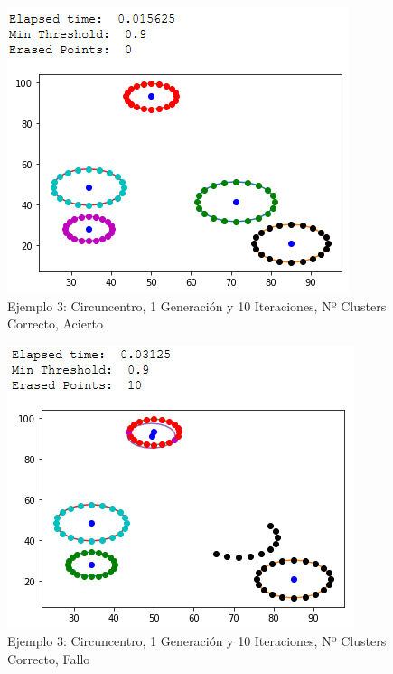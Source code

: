 \documentclass[conference,a4paper]{IEEEtran}
\begin{document}
\begin{figure}[H]
\centering
\includegraphics[scale=0.65]{Experimentacion/Ejemplo3/ej3_c_1_10_cc_correct}
\caption{Ejemplo 3: Circuncentro, 1 Generación y 10 Iteraciones,  Nº Clusters Correcto, Acierto\\}
\end{figure}

\begin{figure}[H]
\centering
\includegraphics[scale=0.65]{Experimentacion/Ejemplo3/ej3_c_1_10_cc_wrong}
\caption{Ejemplo 3: Circuncentro, 1 Generación y 10 Iteraciones,  Nº Clusters Correcto, Fallo\\}
\end{figure}
\end{document}
